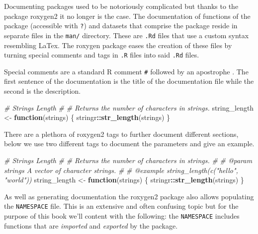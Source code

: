 \documentclass[
]{krantz}
\makeatletter
\newenvironment{Shaded}{\begin{snugshade}}{\end{snugshade}}
\newcommand{\CommentTok}[1]{\textcolor[rgb]{0.37,0.37,0.37}{\textit{#1}}}
\newcommand{\ControlFlowTok}[1]{\textcolor[rgb]{0.27,0.27,0.27}{\textbf{#1}}}
\newcommand{\KeywordTok}[1]{\textcolor[rgb]{0.27,0.27,0.27}{\textbf{#1}}}
\newcommand{\NormalTok}[1]{#1}
\newcommand{\OperatorTok}[1]{\textcolor[rgb]{0.43,0.43,0.43}{\textbf{#1}}}
\newcommand{\StringTok}[1]{\textcolor[rgb]{0.5,0.5,0.5}{#1}}
\newenvironment{kframe}{%
\medskip{}
\setlength{\fboxsep}{.8em}
 \def\at@end@of@kframe{}%
 \ifinner\ifhmode%
  \def\at@end@of@kframe{\end{minipage}}%
  \begin{minipage}{\columnwidth}%
 \fi\fi%
 \def\FrameCommand##1{\hskip\@totalleftmargin \hskip-\fboxsep
 \colorbox{shadecolor}{##1}\hskip-\fboxsep
     \hskip-\linewidth \hskip-\@totalleftmargin \hskip\columnwidth}%
 \MakeFramed {\advance\hsize-\width
   \@totalleftmargin\z@ \linewidth\hsize
   \@setminipage}}%
 {\par\unskip\endMakeFramed%
 \at@end@of@kframe}
\renewenvironment{Shaded}{\begin{kframe}}{\end{kframe}}
\makeatother
\begin{document}
Documenting packages used to be notoriously complicated but thanks to the package roxygen2 it no longer is the case. The documentation of functions of the package (accessible with \texttt{?}) and datasets that comprise the package reside in separate files in the \texttt{man/} directory. These are \texttt{.Rd} files that use a custom syntax resembling LaTex. The roxygen package eases the creation of these files by turning special comments and tags in \texttt{.R} files into said \texttt{.Rd} files.

Special comments are a standard R comment \texttt{\#} followed by an apostrophe \texttt{\textquotesingle{}}. The first sentence of the documentation is the title of the documentation file while the second is the description.

\begin{Shaded}
\begin{Highlighting}[]
\CommentTok{\#\textquotesingle{} Strings Length}
\CommentTok{\#\textquotesingle{} }
\CommentTok{\#\textquotesingle{} Returns the number of characters in strings. }
\NormalTok{string\_length <{-}}\StringTok{ }\ControlFlowTok{function}\NormalTok{(strings) \{}
\NormalTok{  stringr}\OperatorTok{::}\KeywordTok{str\_length}\NormalTok{(strings)}
\NormalTok{\}}
\end{Highlighting}
\end{Shaded}

There are a plethora of roxygen2 tags to further document different sections, below we use two different tags to document the parameters and give an example.

\begin{Shaded}
\begin{Highlighting}[]
\CommentTok{\#\textquotesingle{} Strings Length}
\CommentTok{\#\textquotesingle{} }
\CommentTok{\#\textquotesingle{} Returns the number of characters in strings. }
\CommentTok{\#\textquotesingle{} }
\CommentTok{\#\textquotesingle{} @param strings A vector of character strings.}
\CommentTok{\#\textquotesingle{} }
\CommentTok{\#\textquotesingle{} @example string\_length(c("hello", "world"))}
\NormalTok{string\_length <{-}}\StringTok{ }\ControlFlowTok{function}\NormalTok{(strings) \{}
\NormalTok{  stringr}\OperatorTok{::}\KeywordTok{str\_length}\NormalTok{(strings)}
\NormalTok{\}}
\end{Highlighting}
\end{Shaded}

As well as generating documentation the roxygen2 package also allows populating the \texttt{NAMESPACE} file. This is an extensive and often confusing topic but for the purpose of this book we'll content with the following: the \texttt{NAMESPACE} includes functions that are \emph{imported} and \emph{exported} by the package.
\end{document}
